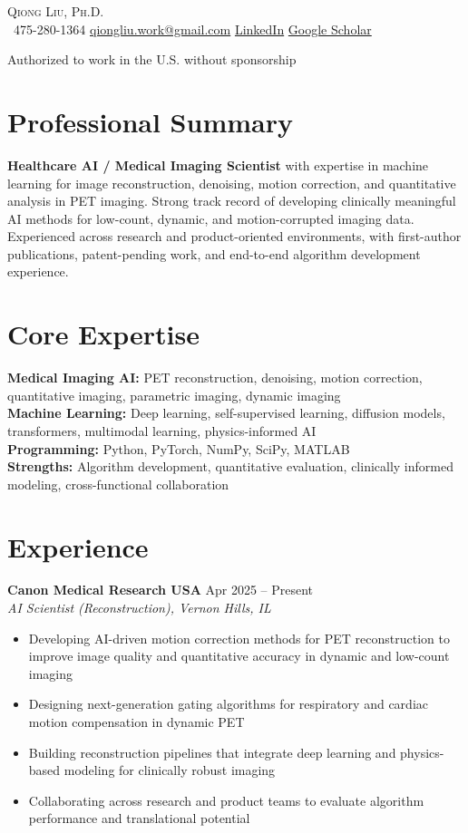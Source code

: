 \begin{center}
{\Huge \scshape Qiong Liu, Ph.D.} \\ \vspace{4pt}
\small
\faPhone\ 475-280-1364 \quad
\href{mailto:qiongliu.work@gmail.com}{qiongliu.work@gmail.com} \quad
\href{https://www.linkedin.com/in/qiong-l-529b23196}{LinkedIn} \quad
\href{https://scholar.google.com/citations?user=SvnpHCkAAAAJ&hl=en}{Google Scholar}

Authorized to work in the U.S. without sponsorship
\end{center}

\section{Professional Summary}
\textbf{Healthcare AI / Medical Imaging Scientist} with expertise in machine learning for image reconstruction, denoising, motion correction, and quantitative analysis in PET imaging. Strong track record of developing clinically meaningful AI methods for low-count, dynamic, and motion-corrupted imaging data. Experienced across research and product-oriented environments, with first-author publications, patent-pending work, and end-to-end algorithm development experience.

\section{Core Expertise}
\textbf{Medical Imaging AI:} PET reconstruction, denoising, motion correction, quantitative imaging, parametric imaging, dynamic imaging \\
\textbf{Machine Learning:} Deep learning, self-supervised learning, diffusion models, transformers, multimodal learning, physics-informed AI \\
\textbf{Programming:} Python, PyTorch, NumPy, SciPy, MATLAB \\
\textbf{Strengths:} Algorithm development, quantitative evaluation, clinically informed modeling, cross-functional collaboration

\section{Experience}
\textbf{Canon Medical Research USA} \hfill Apr 2025 -- Present \\
\textit{AI Scientist (Reconstruction), Vernon Hills, IL}
\begin{itemize}[leftmargin=*]
\item Developing AI-driven motion correction methods for PET reconstruction to improve image quality and quantitative accuracy in dynamic and low-count imaging
\item Designing next-generation gating algorithms for respiratory and cardiac motion compensation in dynamic PET
\item Building reconstruction pipelines that integrate deep learning and physics-based modeling for clinically robust imaging
\item Collaborating across research and product teams to evaluate algorithm performance and translational potential
\end{itemize}

